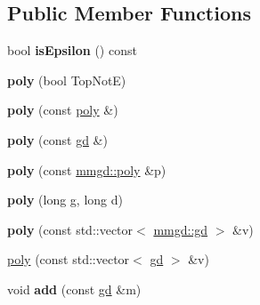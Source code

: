 \subsection*{Public Member Functions}
\begin{DoxyCompactItemize}
\item 
\mbox{\label{classetvo_i_i_1_1poly_a353bfb20ce3f36a59c33daca14d1892c}} 
bool {\bfseries is\+Epsilon} () const
\item 
\mbox{\label{classetvo_i_i_1_1poly_a0e60bb5d6fef4a0d54099f65672b5ae8}} 
{\bfseries poly} (bool Top\+NotE)
\item 
\mbox{\label{classetvo_i_i_1_1poly_a1762ddb945535fbe929613e2bb1f39dc}} 
{\bfseries poly} (const \mbox{\hyperlink{classetvo_i_i_1_1poly}{poly}} \&)
\item 
\mbox{\label{classetvo_i_i_1_1poly_abc4a5b558c505c982d4a755ed0bb36c1}} 
{\bfseries poly} (const \mbox{\hyperlink{classetvo_i_i_1_1gd}{gd}} \&)
\item 
\mbox{\label{classetvo_i_i_1_1poly_aa321444d01a4172e3d22b92555983004}} 
{\bfseries poly} (const \mbox{\hyperlink{classmmgd_1_1poly}{mmgd\+::poly}} \&p)
\item 
\mbox{\label{classetvo_i_i_1_1poly_a367aed21018a2bd216caf41655d034d1}} 
{\bfseries poly} (long g, long d)
\item 
\mbox{\label{classetvo_i_i_1_1poly_a4234613f4b26238a03af66cef2ff31aa}} 
{\bfseries poly} (const std\+::vector$<$ \mbox{\hyperlink{classmmgd_1_1gd}{mmgd\+::gd}} $>$ \&v)
\item 
\mbox{\hyperlink{classetvo_i_i_1_1poly_ae6a829a66995bc2fe54024c96dc23c24}{poly}} (const std\+::vector$<$ \mbox{\hyperlink{classetvo_i_i_1_1gd}{gd}} $>$ \&v)
\item 
\mbox{\label{classetvo_i_i_1_1poly_a1710fc7eabe9e7466f421c829a9e2a2a}} 
void {\bfseries add} (const \mbox{\hyperlink{classetvo_i_i_1_1gd}{gd}} \&m)
\item 
\mbox{\label{classetvo_i_i_1_1poly_a92c17ebde40549708b5d8d088b48f3cb}} 

\end{DoxyCompactItemize}
